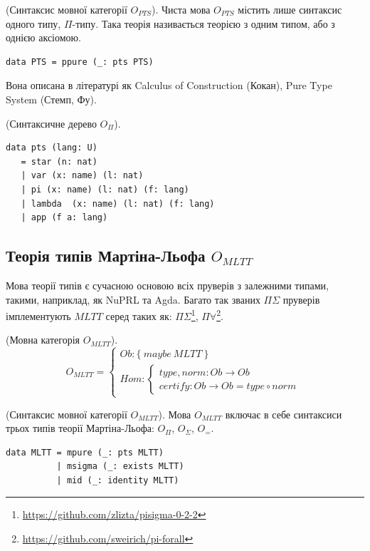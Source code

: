\begin{definition} (Синтаксис мовної категорії $O_{PTS}$).
Чиста мова $O_{PTS}$ містить лише синтаксис одного типу, $\Pi$-типу.
Така теорія називається теорією з одним типом, або з однією аксіомою.
\begin{lstlisting}
data PTS = ppure (_: pts PTS)
\end{lstlisting}
\end{definition}

Вона описана в літературі як Calculus of Construction (Кокан),
Pure Type System (Стемп, Фу).

\begin{definition} (Синтаксичне дерево $O_\Pi$).
\begin{lstlisting}[mathescape=true]
data pts (lang: U)
   = star (n: nat)
   | var (x: name) (l: nat)
   | pi (x: name) (l: nat) (f: lang)
   | lambda  (x: name) (l: nat) (f: lang)
   | app (f a: lang)
\end{lstlisting}
\end{definition}

\subsection{Теорія типів Мартіна-Льофа $O_{MLTT}$}

Мова теорії типів є сучасною основою всіх пруверів з залежними типами,
такими, наприклад, як NuPRL та Agda. Багато так званих $\Pi\Sigma$ пруверів
імплементують $MLTT$ серед таких як:
$\Pi\Sigma$\footnote{\url{https://github.com/zlizta/pisigma-0-2-2}},
$\Pi\forall$\footnote{\url{https://github.com/sweirich/pi-forall}}.

\begin{definition} (Мовна категорія $O_{MLTT}$).
\begin{equation}
O_{MLTT} =
\begin{cases}
Ob: \{\ maybe\ MLTT\ \} \\
Hom: \begin{cases}
type,norm: Ob \rightarrow Ob \\
certify: Ob \rightarrow Ob = type \circ norm
\end{cases}
\end{cases}
\end{equation}
\end{definition}

\begin{definition} (Синтаксис мовної категорії $O_{MLTT}$).
Мова $O_{MLTT}$ включає в себе синтаксиси трьох типів
теорії Мартіна-Льофа: $O_\Pi$, $O_\Sigma$, $O_=$.
\begin{lstlisting}
data MLTT = mpure (_: pts MLTT)
          | msigma (_: exists MLTT)
          | mid (_: identity MLTT)
\end{lstlisting}
\end{definition}

